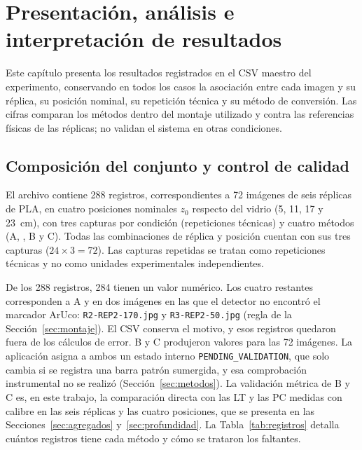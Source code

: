 \chapter{Presentación, análisis e interpretación de resultados}
\label{cap:resultados}

Este capítulo presenta los resultados registrados en el CSV maestro del experimento, conservando en todos los casos la asociación entre cada imagen y su réplica, su posición nominal, su repetición técnica y su método de conversión. Las cifras comparan los métodos dentro del montaje utilizado y contra las referencias físicas de las réplicas; no validan el sistema en otras condiciones.

\section{Composición del conjunto y control de calidad}
\label{sec:conjunto}

El archivo contiene 288 registros, correspondientes a 72 imágenes de seis réplicas de PLA, en cuatro posiciones nominales $z_0$ respecto del vidrio (5, 11, 17 y 23~cm), con tres capturas por condición (repeticiones técnicas) y cuatro métodos (A, \Aprime, B y C). Todas las combinaciones de réplica y posición cuentan con sus tres capturas ($24 \times 3 = 72$). Las capturas repetidas se tratan como repeticiones técnicas y no como unidades experimentales independientes.

De los 288 registros, 284 tienen un valor numérico. Los cuatro restantes corresponden a A y \Aprime{} en dos imágenes en las que el detector no encontró el marcador ArUco: \texttt{R2-REP2-170.jpg} y \texttt{R3-REP2-50.jpg} (regla de la Sección~\ref{sec:montaje}). El CSV conserva el motivo, y esos registros quedaron fuera de los cálculos de error. B y C produjeron valores para las 72 imágenes. La aplicación asigna a ambos un estado interno \texttt{PENDING\_VALIDATION}, que solo cambia si se registra una barra patrón sumergida, y esa comprobación instrumental no se realizó (Sección~\ref{sec:metodos}). La validación métrica de B y C es, en este trabajo, la comparación directa con las LT y las PC medidas con calibre en las seis réplicas y las cuatro posiciones, que se presenta en las Secciones~\ref{sec:agregados} y~\ref{sec:profundidad}. La Tabla~\ref{tab:registros} detalla cuántos registros tiene cada método y cómo se trataron los faltantes.

